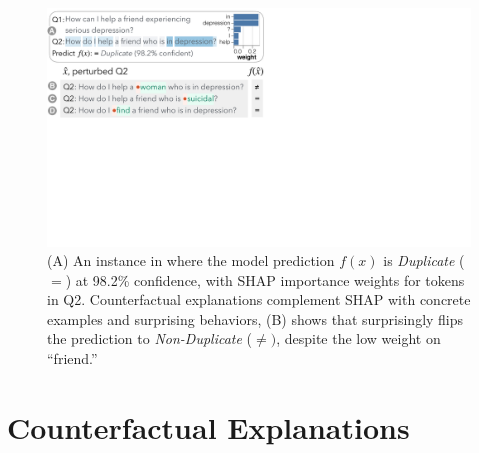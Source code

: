 
\newcommand{\fwone}[1]{\colbox{cfwone}{#1}\xspace}
\newcommand{\fwtwo}[1]{\colbox{cfwtwo}{#1}\xspace}
\newcommand{\fwthree}[1]{\colbox{cfwthree}{#1}\xspace}
\newcommand{\fwfour}[1]{\colbox{cfwfour}{#1}\xspace}

\newcommand{\fexp}[2]{\texttt{[{\color{darkgray}{#1:#2}}]}\xspace}
\newcommand{\fexptag}[1]{\fexp{TAG}{#1}}
\newcommand{\fexpfrom}[1]{\fexp{FROM}{#1}}
\newcommand{\fexpto}[1]{\fexp{TO}{#1}}
\newcommand{\fexptemp}[1]{\fexp{TEMP}{#1}}


\begin{figure}[t]
\centering
\includegraphics[trim={0 21cm 33cm 0cm},clip,width=1\columnwidth]{figures/explanation_v2.pdf}
\vspace{-15pt}
\caption{
(A) An instance in \qqp where the model prediction
$f(x)$ is \emph{Duplicate} ($=$) at 98.2\% confidence, with SHAP importance weights for tokens in Q2.
Counterfactual explanations complement SHAP with concrete examples and surprising behaviors, \eg (B) shows that  surprisingly flips the prediction to \emph{Non-Duplicate} ($\neq)$, despite the low weight on ``friend.''
}
\vspace{-5pt}
\label{fig:explanation}
\end{figure}
\section{Counterfactual Explanations}
\label{sec:app_explain}

